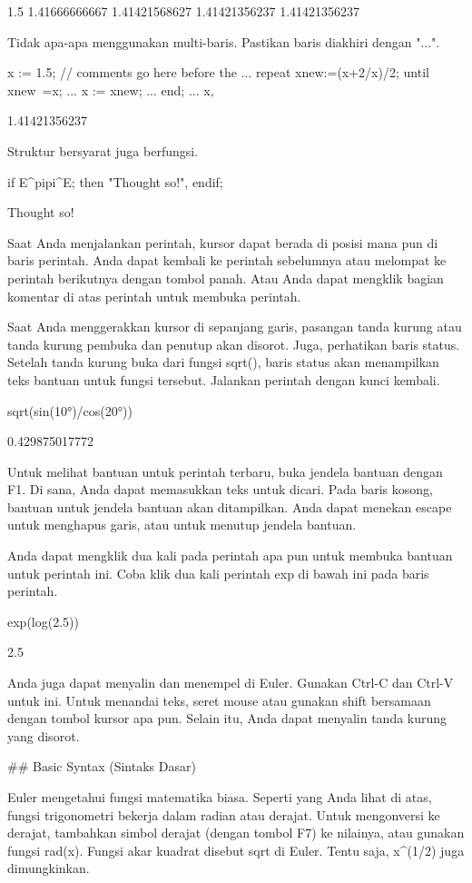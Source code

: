 \documentclass{article}
\begin{document}
    1.5
    1.41666666667
    1.41421568627
    1.41421356237
    1.41421356237

Tidak apa-apa menggunakan multi-baris. Pastikan baris diakhiri dengan
"...".


\>x := 1.5; // comments go here before the ...  
\>   repeat xnew:=(x+2/x)/2; until xnew~=x; ...  
\>      x := xnew; ...  
\>   end; ...  
\>   x,


    1.41421356237

Struktur bersyarat juga berfungsi.


\>if E^pi\>pi^E; then "Thought so!", endif;


    Thought so!

Saat Anda menjalankan perintah, kursor dapat berada di posisi mana pun
di baris perintah. Anda dapat kembali ke perintah sebelumnya atau
melompat ke perintah berikutnya dengan tombol panah. Atau Anda dapat
mengklik bagian komentar di atas perintah untuk membuka perintah.


Saat Anda menggerakkan kursor di sepanjang garis, pasangan tanda
kurung atau tanda kurung pembuka dan penutup akan disorot. Juga,
perhatikan baris status. Setelah tanda kurung buka dari fungsi sqrt(),
baris status akan menampilkan teks bantuan untuk fungsi tersebut.
Jalankan perintah dengan kunci kembali.


\>sqrt(sin(10°)/cos(20°))


    0.429875017772

Untuk melihat bantuan untuk perintah terbaru, buka jendela bantuan
dengan F1. Di sana, Anda dapat memasukkan teks untuk dicari. Pada
baris kosong, bantuan untuk jendela bantuan akan ditampilkan. Anda
dapat menekan escape untuk menghapus garis, atau untuk menutup jendela
bantuan.


Anda dapat mengklik dua kali pada perintah apa pun untuk membuka
bantuan untuk perintah ini. Coba klik dua kali perintah exp di bawah
ini pada baris perintah.


\>exp(log(2.5))


    2.5

Anda juga dapat menyalin dan menempel di Euler. Gunakan Ctrl-C dan
Ctrl-V untuk ini. Untuk menandai teks, seret mouse atau gunakan shift
bersamaan dengan tombol kursor apa pun. Selain itu, Anda dapat
menyalin tanda kurung yang disorot.


## Basic Syntax (Sintaks Dasar)

Euler mengetahui fungsi matematika biasa. Seperti yang Anda lihat di
atas, fungsi trigonometri bekerja dalam radian atau derajat. Untuk
mengonversi ke derajat, tambahkan simbol derajat (dengan tombol F7) ke
nilainya, atau gunakan fungsi rad(x). Fungsi akar kuadrat disebut sqrt
di Euler. Tentu saja, x^(1/2) juga dimungkinkan.
\end{document}
